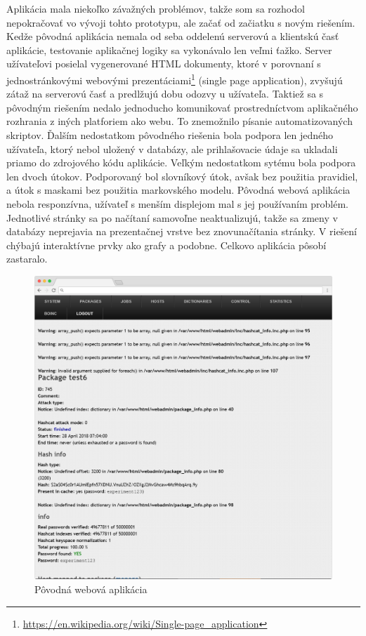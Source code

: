 \documentclass[slovak]{fitthesis}
\begin{document}
Aplikácia mala niekoľko závažných problémov, takže som sa rozhodol nepokračovať vo vývoji tohto prototypu, ale začať od začiatku s novým riešením. Kedže pôvodná aplikácia nemala od seba oddelenú serverovú a klientskú časť aplikácie, testovanie aplikačnej logiky sa vykonávalo len veľmi ťažko. Server užívateľovi posielal vygenerované HTML dokumenty, ktoré v porovnaní s jednostránkovými webovými prezentáciami\footnote{\url{https://en.wikipedia.org/wiki/Single-page_application}} (single page application), zvyšujú zátaž na serverovú časť a predlžujú dobu odozvy u užívateľa. Taktiež sa s pôvodným riešením nedalo jednoducho komunikovať prostredníctvom aplikačného rozhrania z iných platforiem ako webu. To znemožnilo písanie automatizovaných skriptov. Ďalším nedostatkom pôvodného riešenia bola podpora len jedného užívateľa, ktorý nebol uložený v databázy, ale prihlašovacie údaje sa ukladali priamo do zdrojového kódu aplikácie. Veľkým nedostatkom sytému bola podpora len dvoch útokov. Podporovaný bol slovníkový útok, avšak bez použitia pravidiel, a útok s maskami bez použitia markovského modelu. Pôvodná webová aplikácia nebola responzívna, užívateľ s menším displejom mal s jej používaním problém. Jednotlivé stránky sa po načítaní samovoľne neaktualizujú, takže sa zmeny v databázy neprejavia na prezentačnej vrstve bez znovunačítania stránky. V riešení chýbajú interaktívne prvky ako grafy a podobne. Celkovo aplikácia pôsobí zastaralo.
\begin{figure}[H]
    \centering
    \includegraphics[scale=0.3]{obrazky/oldWebadmin2Frame.PNG}
    \caption{Pôvodná webová aplikácia}
    \label{fig:oldFitcrack2}
\end{figure}
\end{document}
